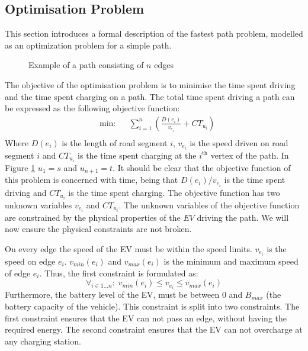 \subsection{Optimisation Problem}\label{sec:optiprob}
This section introduces a formal description of the fastest path problem, modelled as an optimization problem for a simple path.

\begin{figure}[h!]
\centering
    \caption{Example of a path consisting of $n$ edges} \label{fig:pathexample}
\end{figure}

The objective of the optimisation problem is to minimise the time spent driving and the time spent charging on a path. The total time spent driving a path can be expressed as the following objective function:
\begin{equation*}
\begin{aligned} &
{\text{min:}}
& & \sum_{i=1}^{n} \left(\frac{D(e_i)}{v_{e_i}} + CT_{u_i} \right)\\
\end{aligned}
\end{equation*}\label{eq:objfunction}
Where $D(e_i)$ is the length of road segment $i$, $v_{e_i}$ is the speed driven on road segment $i$ and $CT_{u_i}$ is the time spent charging at the $i^{\text{th}}$ vertex of the path. In Figure \ref{fig:pathexample} $u_1 = s$ and $u_{n+1} = t$. It should be clear that the objective function of this problem is concerned with time, being that \( D(e_i)/v_{e_i} \) is the time spent driving and $CT_{u_i}$ is the time spent charging. The objective function has two unknown variables $v_{e_i}$ and $CT_{u_i}$. The unknown variables of the objective function are constrained by the physical properties of the $EV$ driving the path. We will now ensure the physical constraints are not broken.

On every edge the speed of the EV must be within the speed limits. $v_{e_i}$ is the speed on edge $e_i$. $v_{min}(e_i)$ and $v_{max}(e_i)$ is the minimum and maximum speed of edge $e_i$. Thus, the first constraint is formulated as:
\begin{equation*}
\forall_{i\in1 \dots n }:\;v_{min}(e_i) \leq v_{e_i} \leq v_{max}(e_i)
\end{equation*}
Furthermore, the battery level of the EV, must be between $0$ and $B_{max}$ (the battery capacity of the vehicle).
This constraint is split into two constraints. The first constraint ensures that the EV can not pass an edge, without having the required energy. The second constraint ensures that the EV can not overcharge at any charging station.

